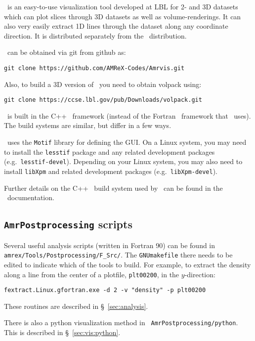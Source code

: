 \amrvis\ is an easy-to-use visualization tool developed at LBL for
2- and 3D datasets which can plot slices through 3D datasets as well
as volume-renderings.  It can also very easily extract 1D lines
through the dataset along any coordinate direction.  It is distributed
separately from the \maestroex\ distribution.

\amrvis\ can be obtained via git from github as:
\begin{verbatim}
git clone https://github.com/AMReX-Codes/Amrvis.git
\end{verbatim}
Also, to build a 3D version of \amrvis\ you need to obtain volpack using:
\begin{verbatim}
git clone https://ccse.lbl.gov/pub/Downloads/volpack.git
\end{verbatim}
\amrvis\ is built in the C++ \amrex\ framework (instead of the Fortran 
\amrex\ framework that \maestroex\ uses).  The build systems are similar,
but differ in a few ways.  

\amrvis\ uses the {\tt Motif} library for defining the GUI.  On a Linux 
system, you may need to install the {\tt lesstif} package and any
related development packages (e.g.\ {\tt lesstif-devel}).  Depending
on your Linux system, you may also need to install {\tt libXpm} and
related development packages (e.g.\ {\tt libXpm-devel}).  

Further details on the C++ \amrex\ build system used by \amrvis\
can be found in the \amrex\ documentation.

\subsection{{\tt AmrPostprocessing} scripts}

Several useful analysis scripts (written in Fortran 90) can be found
in {\tt amrex/Tools/Postprocessing/F\_Src/}.
The {\tt GNUmakefile} there needs to be edited to
indicate which of the tools to build.  For example, to extract the
density along a line from the center of a plotfile, {\tt plt00200}, in
the $y$-direction:

\begin{verbatim}
fextract.Linux.gfortran.exe -d 2 -v "density" -p plt00200
\end{verbatim}

These routines are described in \S~\ref{sec:analysis}.

There is also a python visualization method in {\tt
AmrPostprocessing/python}.  This is described
in \S~\ref{sec:vis:python}.


